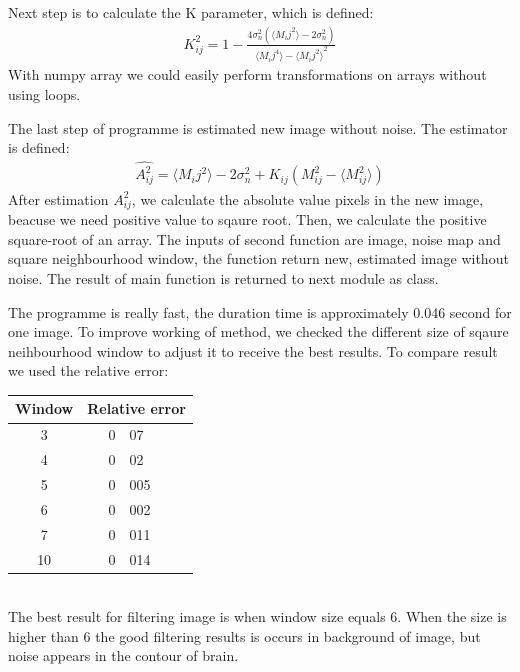 Next step is to calculate the K parameter, which is defined:
\begin{equation}
\begin{aligned}K_{ij}^{2}=1-\frac{4\sigma_{n}^{2}(\langle M_{i}j^{2}\rangle-2\sigma_{n}^{2})}{\langle M_{i}j^{4}\rangle-{\langle M_{i}j^{2}\rangle}^{2}}\end{aligned}
\label{m4Im2}
\end{equation}
With numpy array we could easily perform transformations on arrays without using loops. 

The last step of programme is estimated new image without noise. The estimator is defined:
\begin{equation}
\begin{aligned}\widehat{A_{ij}^{2}}=\langle M_{i}j^{2}\rangle-2\sigma_{n}^{2}+K_{ij}(M_{ij}^{2}-\langle M_{ij}^{2}\rangle)\end{aligned}
\label{m4Im3}
\end{equation}
After estimation $A_{ij}^2$, we calculate the absolute value pixels in the new image, beacuse we need positive value to sqaure root. Then, we calculate the positive square-root of an array. The inputs of second function are image, noise map and square neighbourhood window, the function return new, estimated image without noise. The result of main function is returned to next module as class.

The programme is really fast, the duration time is approximately 0.046 second for one image.
To improve working of method, we checked the different size of sqaure neihbourhood window to adjust it to receive the best results. To compare result we used the relative error:
\hfill{}\\

\begin{tabular}{c r @{,} l}
Window &
\multicolumn{2}{c}{Relative error}\\ \hline
3 & 0&07 \\
4 & 0&02 \\
5 & 0&005 \\
6 & 0&002 \\
7 & 0&011 \\
10 & 0&014 \\

\end{tabular}
\hfill{}\\


The best result for filtering image is when window size equals 6. When the size is higher than 6 the good filtering results is occurs in background of image, but noise appears in the contour of brain.

